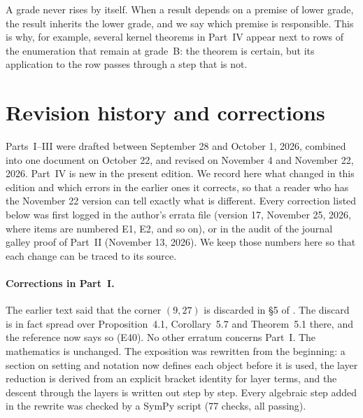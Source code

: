 \documentclass[a4paper,11pt]{article}
\theoremstyle{jsplain}
\theoremstyle{jsdef}
\theoremstyle{jsrem}
\begin{document}
A grade never rises by itself. When a result depends on a premise of lower grade, the result inherits the lower grade, and we say which premise is responsible. This is why, for example, several kernel theorems in Part~IV appear next to rows of the enumeration that remain at grade~B: the theorem is certain, but its application to the row passes through a step that is not.



\section{Revision history and corrections}\label{app:history}

Parts~I--III were drafted between September 28 and October 1, 2026, combined into one document on October 22, and revised on November 4 and November 22, 2026. Part~IV is new in the present edition. We record here what changed in this edition and which errors in the earlier ones it corrects, so that a reader who has the November 22 version can tell exactly what is different. Every correction listed below was first logged in the author's errata file (version 17, November 25, 2026, where items are numbered E1, E2, and so on), or in the audit of the journal galley proof of Part~II (November 13, 2026). We keep those numbers here so that each change can be traced to its source.

\paragraph{Corrections in Part~I.} The earlier text said that the corner $(9,27)$ is discarded in \S5 of \cite{GGHV}. The discard is in fact spread over Proposition~4.1, Corollary~5.7 and Theorem~5.1 there, and the reference now says so (E40). No other erratum concerns Part~I. The mathematics is unchanged. The exposition was rewritten from the beginning: a section on setting and notation now defines each object before it is used, the layer reduction is derived from an explicit bracket identity for layer terms, and the descent through the layers is written out step by step. Every algebraic step added in the rewrite was checked by a SymPy script (77 checks, all passing).
\end{document}
